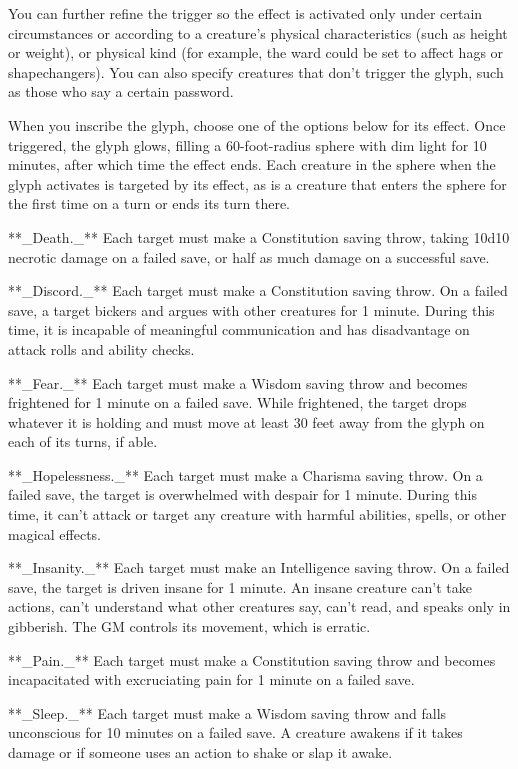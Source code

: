 You can further refine the trigger so the effect is activated only under certain circumstances or according to a creature’s physical characteristics (such as height or weight), or physical kind (for example, the ward could be set to affect hags or shapechangers). You can also specify creatures that don’t trigger the glyph, such as those who say a certain password.

When you inscribe the glyph, choose one of the options below for its effect. Once triggered, the glyph glows, filling a 60-foot-radius sphere with dim light for 10 minutes, after which time the effect ends. Each creature in the sphere when the glyph activates is targeted by its effect, as is a creature that enters the sphere for the first time on a turn or ends its turn there.

**_Death._** Each target must make a Constitution saving throw, taking 10d10 necrotic damage on a failed save, or half as much damage on a successful save.

**_Discord._** Each target must make a Constitution saving throw. On a failed save, a target bickers and argues with other creatures for 1 minute. During this time, it is incapable of meaningful communication and has disadvantage on attack rolls and ability checks.

**_Fear._** Each target must make a Wisdom saving throw and becomes frightened for 1 minute on a failed save. While frightened, the target drops whatever it is holding and must move at least 30 feet away from the glyph on each of its turns, if able.

**_Hopelessness._** Each target must make a Charisma saving throw. On a failed save, the target is overwhelmed with despair for 1 minute. During this time, it can’t attack or target any creature with harmful abilities, spells, or other magical effects.

**_Insanity._** Each target must make an Intelligence saving throw. On a failed save, the target is driven insane for 1 minute. An insane creature can’t take actions, can’t understand what other creatures say, can’t read, and speaks only in gibberish. The GM controls its movement, which is erratic.

**_Pain._** Each target must make a Constitution saving throw and becomes incapacitated with excruciating pain for 1 minute on a failed save.

**_Sleep._** Each target must make a Wisdom saving throw and falls unconscious for 10 minutes on a failed save. A creature awakens if it takes damage or if someone uses an action to shake or slap it awake.

